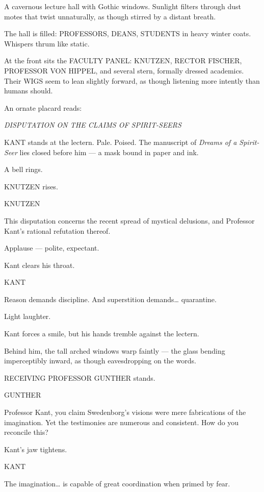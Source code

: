 \documentclass[12pt]{article}
\newenvironment{dialogue}[1]{%
  \vspace{0.8\baselineskip}%
  \noindent\hspace*{2.3in}\textsc{#1}\par%
  \noindent\hspace*{1.5in}\begin{minipage}[t]{4.5in}%
}{%
  \end{minipage}\par%
}
\begin{document}
A cavernous lecture hall with Gothic windows. Sunlight filters through 
dust motes that twist unnaturally, as though stirred by a distant breath.

The hall is filled: PROFESSORS, DEANS, STUDENTS in heavy winter coats.
Whispers thrum like static.

At the front sits the FACULTY PANEL:
KNUTZEN, RECTOR FISCHER, PROFESSOR VON HIPPEL, and several stern,
formally dressed academics. Their WIGS seem to lean slightly forward,
as though listening more intently than humans should.

An ornate placard reads:

\centerline{\textit{DISPUTATION ON THE CLAIMS OF SPIRIT-SEERS}}

KANT stands at the lectern. Pale. Poised. The manuscript of 
\textit{Dreams of a Spirit-Seer} lies closed before him — 
a mask bound in paper and ink.

A bell rings.

KNUTZEN rises.

\begin{dialogue}{KNUTZEN}
This disputation concerns the recent spread of mystical delusions,  
and Professor Kant’s rational refutation thereof.
\end{dialogue}

Applause — polite, expectant.

Kant clears his throat.

\begin{dialogue}{KANT}
Reason demands discipline.  
And superstition demands… quarantine.
\end{dialogue}

Light laughter.

Kant forces a smile, but his hands tremble against the lectern.

Behind him, the tall arched windows warp faintly — the glass bending 
imperceptibly inward, as though eavesdropping on the words.

RECEIVING PROFESSOR GUNTHER stands.

\begin{dialogue}{GUNTHER}
Professor Kant, you claim Swedenborg’s visions  
were mere fabrications of the imagination.  
Yet the testimonies are numerous and consistent.
How do you reconcile this?
\end{dialogue}

Kant’s jaw tightens.

\begin{dialogue}{KANT}
The imagination… 
is capable of great coordination when primed by fear.
\end{dialogue}
\end{document}

